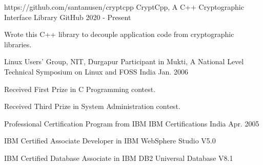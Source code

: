 

\begin{cventries}

  \cventry
    {https://github.com/santanusen/cryptcpp} %
    {CryptCpp, A C++ Cryptographic Interface Library} %
    {GitHub} %
    {2020 - Present} %
    {
      \begin{cvitems} %
        \item {Wrote this C++ library to decouple application code from cryptographic libraries.}
      \end{cvitems}
    }

  \cventry
    {Linux Users' Group, NIT, Durgapur} %
    {Participant in Mukti, A National Level Technical Symposium on Linux and FOSS} %
    {India}
    {Jan. 2006} %
    {
	\begin{cvitems}
	  \item {Received First Prize in C Programming contest.} %
	  \item {Received Third Prize in System Administration contest.} %
	\end{cvitems}
    }

  \cventry
    {Professional Certification Program from IBM} %
    {IBM Certifications} %
    {India}
    {Apr. 2005} %
    {
	\begin{cvitems}
	  \item {IBM Certified Associate Developer in IBM WebSphere Studio V5.0}
	  \item {IBM Certified Database Associate in IBM DB2 Universal Database V8.1}
	\end{cvitems}
    }

\end{cventries}
